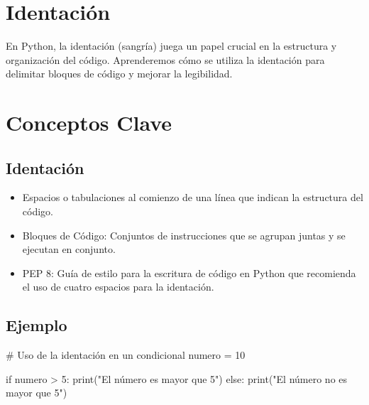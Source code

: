 \documentclass[
  a4paper,
  onepage,
  openany]{scrreprt}
\newenvironment{Shaded}{\begin{snugshade}}{\end{snugshade}}
\newcommand{\BuiltInTok}[1]{\textcolor[rgb]{0.00,0.23,0.31}{#1}}
\newcommand{\CommentTok}[1]{\textcolor[rgb]{0.37,0.37,0.37}{#1}}
\newcommand{\ControlFlowTok}[1]{\textcolor[rgb]{0.00,0.23,0.31}{#1}}
\newcommand{\DecValTok}[1]{\textcolor[rgb]{0.68,0.00,0.00}{#1}}
\newcommand{\NormalTok}[1]{\textcolor[rgb]{0.00,0.23,0.31}{#1}}
\newcommand{\OperatorTok}[1]{\textcolor[rgb]{0.37,0.37,0.37}{#1}}
\newcommand{\StringTok}[1]{\textcolor[rgb]{0.13,0.47,0.30}{#1}}
\providecommand{\tightlist}{%
  \setlength{\itemsep}{0pt}\setlength{\parskip}{0pt}}\usepackage{longtable,booktabs,array}
\begin{document}
\hypertarget{identaciuxf3n-2}{%
\section{Identación}\label{identaciuxf3n-2}}

En Python, la identación (sangría) juega un papel crucial en la
estructura y organización del código. Aprenderemos cómo se utiliza la
identación para delimitar bloques de código y mejorar la legibilidad.

\hypertarget{conceptos-clave-7}{%
\section{Conceptos Clave}\label{conceptos-clave-7}}

\hypertarget{identaciuxf3n-3}{%
\subsection{Identación}\label{identaciuxf3n-3}}

\begin{itemize}
\tightlist
\item
  Espacios o tabulaciones al comienzo de una línea que indican la
  estructura del código.
\item
  Bloques de Código: Conjuntos de instrucciones que se agrupan juntas y
  se ejecutan en conjunto.
\item
  PEP 8: Guía de estilo para la escritura de código en Python que
  recomienda el uso de cuatro espacios para la identación.
\end{itemize}

\hypertarget{ejemplo-7}{%
\subsection{Ejemplo}\label{ejemplo-7}}

\begin{Shaded}
\begin{Highlighting}[]
\CommentTok{\# Uso de la identación en un condicional}
\NormalTok{numero }\OperatorTok{=} \DecValTok{10}

\ControlFlowTok{if}\NormalTok{ numero }\OperatorTok{\textgreater{}} \DecValTok{5}\NormalTok{:}
    \BuiltInTok{print}\NormalTok{(}\StringTok{"El número es mayor que 5"}\NormalTok{)}
\ControlFlowTok{else}\NormalTok{:}
    \BuiltInTok{print}\NormalTok{(}\StringTok{"El número no es mayor que 5"}\NormalTok{)}
\end{Highlighting}
\end{Shaded}
\end{document}
